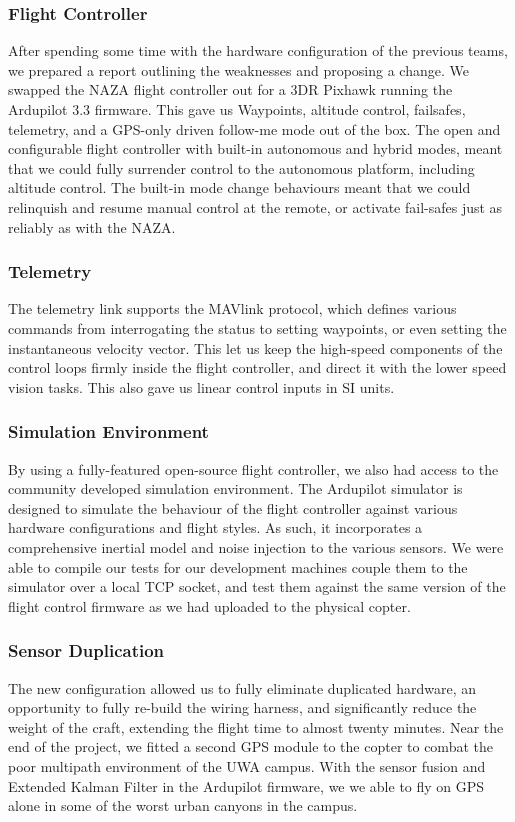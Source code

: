\documentclass[a4paper, 11pt, titlepage]{article}
\begin{document}
    \subsubsection{Flight Controller}
    After spending some time with the hardware configuration of the previous teams, we prepared a report outlining the weaknesses and proposing a change.
    We swapped the NAZA flight controller out for a 3DR Pixhawk running the Ardupilot 3.3 firmware.  This gave us Waypoints, altitude control, failsafes, telemetry, and a GPS-only driven follow-me mode out of the box.
    The open and configurable flight controller with built-in autonomous and hybrid modes, meant that we could fully surrender control to the autonomous platform, including altitude control.  The built-in mode change behaviours meant that we could relinquish and resume manual control at the remote, or activate fail-safes just as reliably as with the NAZA.
    
    \subsubsection{Telemetry}
    The telemetry link supports the MAVlink protocol, which defines various commands from interrogating the status to setting waypoints, or even setting the instantaneous velocity vector.  This let us keep the high-speed components of the control loops firmly inside the flight controller, and direct it with the lower speed vision tasks.  This also gave us linear control inputs in SI units.

    \subsubsection{Simulation Environment}
    By using a fully-featured open-source flight controller, we also had access to the community developed simulation environment.  The Ardupilot simulator is designed to simulate the behaviour of the flight controller against various hardware configurations and flight styles.  As such, it incorporates a comprehensive inertial model and noise injection to the various sensors.  We were able to compile our tests for our development machines couple them to the simulator over a local TCP socket, and test them against the same version of the flight control firmware as we had uploaded to the physical copter.

    \subsubsection{Sensor Duplication}
    The new configuration allowed us to fully eliminate duplicated hardware, an opportunity to fully re-build the wiring harness, and significantly reduce the weight of the craft, extending the flight time to almost twenty minutes.
    Near the end of the project, we fitted a second GPS module to the copter to combat the poor multipath environment of the UWA campus.  With the sensor fusion and Extended Kalman Filter in the Ardupilot firmware, we we able to fly on GPS alone in some of the worst urban canyons in the campus.
\end{document}
